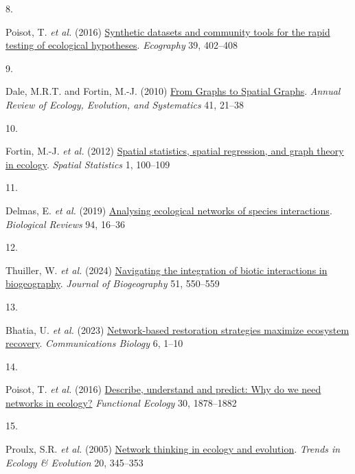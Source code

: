 \documentclass[
]{article}
\newlength{\cslhangindent}
\newlength{\csllabelwidth}
\newenvironment{CSLReferences}[2] %
 {\begin{list}{}{%
  \setlength{\itemindent}{0pt}
  \setlength{\leftmargin}{0pt}
  \setlength{\parsep}{0pt}
  \ifodd #1
   \setlength{\leftmargin}{\cslhangindent}
   \setlength{\itemindent}{-1\cslhangindent}
  \fi
  \setlength{\itemsep}{#2\baselineskip}}}
 {\end{list}}
\newcommand{\CSLLeftMargin}[1]{\parbox[t]{\csllabelwidth}{\strut#1\strut}}
\newcommand{\CSLRightInline}[1]{\parbox[t]{\linewidth - \csllabelwidth}{\strut#1\strut}}
\begin{document}
\begin{CSLReferences}{0}{0}
\CSLLeftMargin{8. }%
\CSLRightInline{Poisot, T. \emph{et al.} (2016)
\href{https://doi.org/10.1111/ecog.01941}{Synthetic datasets and
community tools for the rapid testing of ecological hypotheses}.
\emph{Ecography} 39, 402--408}

\CSLLeftMargin{9. }%
\CSLRightInline{Dale, M.R.T. and Fortin, M.-J. (2010)
\href{https://www.jstor.org/stable/27896212}{From {Graphs} to {Spatial
Graphs}}. \emph{Annual Review of Ecology, Evolution, and Systematics}
41, 21--38}

\CSLLeftMargin{10. }%
\CSLRightInline{Fortin, M.-J. \emph{et al.} (2012)
\href{https://doi.org/10.1016/j.spasta.2012.02.004}{Spatial statistics,
spatial regression, and graph theory in ecology}. \emph{Spatial
Statistics} 1, 100--109}

\CSLLeftMargin{11. }%
\CSLRightInline{Delmas, E. \emph{et al.} (2019)
\href{https://doi.org/10.1111/brv.12433}{Analysing ecological networks
of species interactions}. \emph{Biological Reviews} 94, 16--36}

\CSLLeftMargin{12. }%
\CSLRightInline{Thuiller, W. \emph{et al.} (2024)
\href{https://doi.org/10.1111/jbi.14734}{Navigating the integration of
biotic interactions in biogeography}. \emph{Journal of Biogeography} 51,
550--559}

\CSLLeftMargin{13. }%
\CSLRightInline{Bhatia, U. \emph{et al.} (2023)
\href{https://doi.org/10.1038/s42003-023-05622-3}{Network-based
restoration strategies maximize ecosystem recovery}.
\emph{Communications Biology} 6, 1--10}

\CSLLeftMargin{14. }%
\CSLRightInline{Poisot, T. \emph{et al.} (2016)
\href{https://www.jstor.org/stable/48582345}{Describe, understand and
predict: Why do we need networks in ecology?} \emph{Functional Ecology}
30, 1878--1882}

\CSLLeftMargin{15. }%
\CSLRightInline{Proulx, S.R. \emph{et al.} (2005)
\href{https://doi.org/10.1016/j.tree.2005.04.004}{Network thinking in
ecology and evolution}. \emph{Trends in Ecology \& Evolution} 20,
345--353}


\end{CSLReferences}
\end{document}
